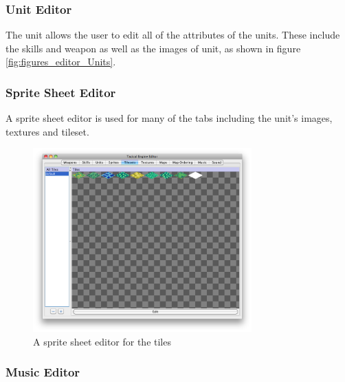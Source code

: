 \subsubsection{Unit Editor}
\label{ssub:unit_editors}
The unit allows the user to edit all of the attributes of the units. These include the skills and weapon as well as the images of unit, as shown in figure \ref{fig:figures_editor_Units}. 


\subsubsection{Sprite Sheet Editor}
A sprite sheet editor is used for many of the tabs including the unit's images, textures and tileset.
\begin{figure}[htbp]
	\centering
		\includegraphics[width=0.75\textwidth]{figures/editor/tileset_edit.png}
	\caption{A sprite sheet  editor for the tiles}
	\label{fig:figures_editor_tileset_edit}
\end{figure}

\subsubsection{Music Editor}
\label{ssub:music_editor}

